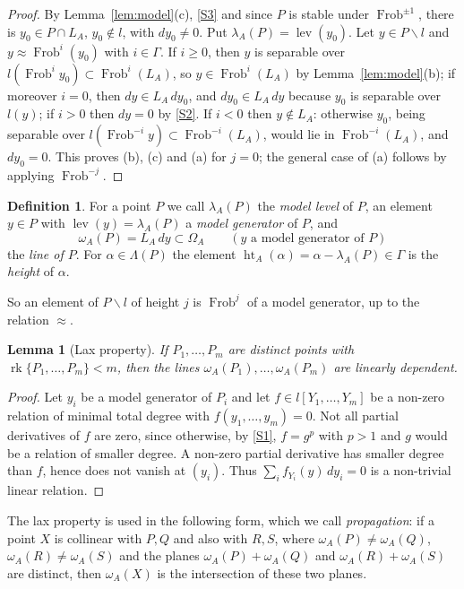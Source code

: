 \documentclass[11pt]{amsart}
\newtheorem{lemma}[theorem]{Lemma}
\theoremstyle{definition}
\newtheorem{definition}[theorem]{Definition}
\theoremstyle{remark}
\newcommand{\rk}{\operatorname{rk}}
\newcommand{\Frob}{\operatorname{Frob}}
\newcommand{\lev}{\operatorname{lev}}
\newcommand{\hgt}{\operatorname{ht}}
\newcommand{\sm}{\smallsetminus}
\begin{document}
\begin{proof}
By Lemma~\ref{lem:model}(c), \ref{S3} and since $P$ is stable under $\Frob^{\pm1}$, there is $y_0\in P\cap L_A$, $y_0\notin l$, with $dy_0\neq0$. Put $\lambda_A(P)=\lev(y_0)$.
Let $y\in P\sm l$ and $y\approx\Frob^i(y_0)$ with $i\in\Gamma$. If $i\ge0$, then $y$ is separable over $l(\Frob^iy_0)\subset\Frob^i(L_A)$, so $y\in\Frob^i(L_A)$ by Lemma~\ref{lem:model}(b);
if moreover $i=0$, then $dy\in L_A\,dy_0$, and $dy_0\in L_A\,dy$ because $y_0$ is separable over $l(y)$; if $i>0$ then $dy=0$ by \ref{S2}.
If $i<0$ then $y\notin L_A$: otherwise $y_0$, being separable over $l(\Frob^{-i}y)\subset\Frob^{-i}(L_A)$, would lie in $\Frob^{-i}(L_A)$, and $dy_0=0$.
This proves (b), (c) and (a) for $j=0$; the general case of (a) follows by applying $\Frob^{-j}$.
\end{proof}

\begin{definition}
For a point $P$ we call $\lambda_A(P)$ the \emph{model level} of $P$, an element $y\in P$ with $\lev(y)=\lambda_A(P)$ a \emph{model generator} of $P$, and
\[ \omega_A(P)=L_A\,dy\subset\Omega_A\qquad(y\text{ a model generator of }P) \]
the \emph{line of $P$}. For $\alpha\in\Lambda(P)$ the element $\hgt_A(\alpha)=\alpha-\lambda_A(P)\in\Gamma$ is the \emph{height} of $\alpha$.
\end{definition}

So an element of $P\sm l$ of height $j$ is $\Frob^j$ of a model generator, up to the relation $\approx$.

\begin{lemma}[Lax property]\label{lem:lax}
If $P_1,\dots,P_m$ are distinct points with $\rk\{P_1,\dots,P_m\}<m$, then the lines $\omega_A(P_1),\dots,\omega_A(P_m)$ are linearly dependent.
\end{lemma}

\begin{proof}
Let $y_i$ be a model generator of $P_i$ and let $f\in l[Y_1,\dots,Y_m]$ be a non-zero relation of minimal total degree with $f(y_1,\dots,y_m)=0$. Not all partial derivatives of $f$ are zero,
since otherwise, by \ref{S1}, $f=g^p$ with $p>1$ and $g$ would be a relation of smaller degree. A non-zero partial derivative has smaller degree than $f$, hence does not vanish at $(y_i)$.
Thus $\sum_i f_{Y_i}(y)\,dy_i=0$ is a non-trivial linear relation.
\end{proof}

The lax property is used in the following form, which we call \emph{propagation}: if a point $X$ is collinear with $P,Q$ and also with $R,S$, where
$\omega_A(P)\neq\omega_A(Q)$, $\omega_A(R)\ne\omega_A(S)$ and the planes $\omega_A(P)+\omega_A(Q)$ and $\omega_A(R)+\omega_A(S)$ are distinct, then
$\omega_A(X)$ is the intersection of these two planes.
\end{document}
